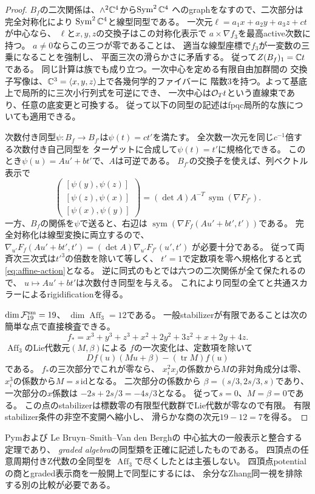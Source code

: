 \begin{proof}
$B_f$の二次関係は、$\wedge^2\mathbb C^4$から$\operatorname{Sym}^2\mathbb C^4$
へのgraphをなすので、二次部分は完全対称化により
$\operatorname{Sym}^2\mathbb C^4$と線型同型である。
一次元$\ell=a_1x+a_2y+a_3z+ct$が中心なら、
$\ell$と$x,y,z$の交換子はこの対称化表示で
$a\times\nabla f_3$を最高active次数に持つ。
$a\ne0$ならこの三つが零であることは、
適当な線型座標で$f_3$が一変数の三乗になることを強制し、
平面三次の滑らかさに矛盾する。
従って$Z(B_f)_1=\mathbb C t$である。
同じ計算は族でも成り立つ。一次中心を定める有限自由加群間の
交換子写像は、$\mathbb C^3=\langle x,y,z\rangle$上で各幾何学的ファイバーに
階数3を持つ。よって基底上で局所的に三次小行列式を可逆にでき、
一次中心は$\mathcal O_Tt$という直線束であり、任意の底変更と可換する。
従って以下の同型の記述はfpqc局所的な族についても適用できる。

次数付き同型$\psi:B_f\to B_{f'}$は$\psi(t)=c t'$を満たす。
全次数一次元を同じ$c^{-1}$倍する次数付き自己同型を
ターゲットに合成して$\psi(t)=t'$に規格化できる。
このとき$\psi(u)=Au'+b t'$で、$A$は可逆である。
$B_{f'}$の交換子を使えば、列ベクトル表示で
\[
 \begin{pmatrix}[\psi(y),\psi(z)]\\
                 [\psi(z),\psi(x)]\\
                 [\psi(x),\psi(y)]\end{pmatrix}
 =(\det A)A^{-T}\,\operatorname{sym}(\nabla F_{f'}).
\]
一方、$B_f$の関係を$\psi$で送ると、右辺は
$\operatorname{sym}(\nabla F_f(Au'+bt',t'))$である。
完全対称化は線型変換に両立するので、
$\nabla_{u'}F_f(Au'+bt',t')=(\det A)\nabla_{u'}F_{f'}(u',t')$
が必要十分である。
従って両斉次三次式は$t'^3$の倍数を除いて等しく、
$t'=1$で定数項を零へ規格化すると式\eqref{eq:affine-action}となる。
逆に同式のもとでは六つの二次関係が全て保たれるので、
$u\mapsto Au'+bt'$は次数付き同型を与える。
これにより同型の全てと共通スカラーによるrigidificationを得る。

$\dim\mathcal F_{19}^{\rm sm}=19$、
$\dim\operatorname{Aff}_3=12$である。
一般stabilizerが有限であることは次の簡単な点で直接検査できる。
\[
 f_*=x^3+y^3+z^3+x^2+2y^2+3z^2+x+2y+4z.
\]
$\operatorname{Aff}_3$のLie代数元$(M,\beta)$による
$f$の一次変化は、定数項を除いて
\[
 Df(u)(Mu+\beta)-(\operatorname{tr}M)f(u)
\]
である。
$f_*$の三次部分でこれが零なら、
$x_i^2x_j$の係数から$M$の非対角成分は零、
$x_i^3$の係数から$M=s\,\mathrm{id}$となる。
二次部分の係数から
$\beta=(s/3,2s/3,s)$であり、一次部分の$x$係数は
$-2s+2s/3=-4s/3$となる。
従って$s=0$、$M=\beta=0$である。
この点のstabilizerは標数零の有限型代数群でLie代数が零なので有限。
有限stabilizer条件の非空不変開へ縮小し、
滑らかな商の次元$19-12=7$を得る。
\end{proof}
\begin{remark}
Pym\cite[\S3.4]{Pym}および
Le Bruyn--Smith--Van den Bergh\cite[\S3]{LBS}の
中心拡大の一般表示と整合する定理であり、
\emph{graded algebra}の同型類を正確に記述したものである。
四頂点の任意周期付きZ代数の全同型を
$\operatorname{Aff}_3$で尽くしたとは主張しない。
四頂点potentialの商とgraded表示商を一般開上で同型にするには、
余分なZhang同一視を排除する別の比較が必要である。
\end{remark}

